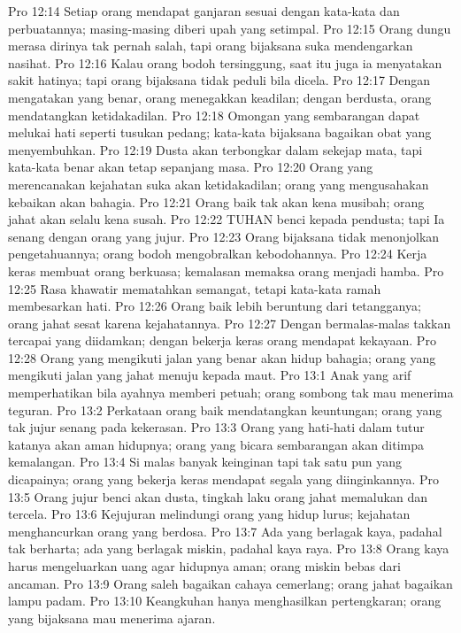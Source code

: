 Pro 12:14  Setiap orang mendapat ganjaran sesuai dengan kata-kata dan perbuatannya; masing-masing diberi upah yang setimpal.
Pro 12:15  Orang dungu merasa dirinya tak pernah salah, tapi orang bijaksana suka mendengarkan nasihat.
Pro 12:16  Kalau orang bodoh tersinggung, saat itu juga ia menyatakan sakit hatinya; tapi orang bijaksana tidak peduli bila dicela.
Pro 12:17  Dengan mengatakan yang benar, orang menegakkan keadilan; dengan berdusta, orang mendatangkan ketidakadilan.
Pro 12:18  Omongan yang sembarangan dapat melukai hati seperti tusukan pedang; kata-kata bijaksana bagaikan obat yang menyembuhkan.
Pro 12:19  Dusta akan terbongkar dalam sekejap mata, tapi kata-kata benar akan tetap sepanjang masa.
Pro 12:20  Orang yang merencanakan kejahatan suka akan ketidakadilan; orang yang mengusahakan kebaikan akan bahagia.
Pro 12:21  Orang baik tak akan kena musibah; orang jahat akan selalu kena susah.
Pro 12:22  TUHAN benci kepada pendusta; tapi Ia senang dengan orang yang jujur.
Pro 12:23  Orang bijaksana tidak menonjolkan pengetahuannya; orang bodoh mengobralkan kebodohannya.
Pro 12:24  Kerja keras membuat orang berkuasa; kemalasan memaksa orang menjadi hamba.
Pro 12:25  Rasa khawatir mematahkan semangat, tetapi kata-kata ramah membesarkan hati.
Pro 12:26  Orang baik lebih beruntung dari tetangganya; orang jahat sesat karena kejahatannya.
Pro 12:27  Dengan bermalas-malas takkan tercapai yang diidamkan; dengan bekerja keras orang mendapat kekayaan.
Pro 12:28  Orang yang mengikuti jalan yang benar akan hidup bahagia; orang yang mengikuti jalan yang jahat menuju kepada maut.
Pro 13:1  Anak yang arif memperhatikan bila ayahnya memberi petuah; orang sombong tak mau menerima teguran.
Pro 13:2  Perkataan orang baik mendatangkan keuntungan; orang yang tak jujur senang pada kekerasan.
Pro 13:3  Orang yang hati-hati dalam tutur katanya akan aman hidupnya; orang yang bicara sembarangan akan ditimpa kemalangan.
Pro 13:4  Si malas banyak keinginan tapi tak satu pun yang dicapainya; orang yang bekerja keras mendapat segala yang diinginkannya.
Pro 13:5  Orang jujur benci akan dusta, tingkah laku orang jahat memalukan dan tercela.
Pro 13:6  Kejujuran melindungi orang yang hidup lurus; kejahatan menghancurkan orang yang berdosa.
Pro 13:7  Ada yang berlagak kaya, padahal tak berharta; ada yang berlagak miskin, padahal kaya raya.
Pro 13:8  Orang kaya harus mengeluarkan uang agar hidupnya aman; orang miskin bebas dari ancaman.
Pro 13:9  Orang saleh bagaikan cahaya cemerlang; orang jahat bagaikan lampu padam.
Pro 13:10  Keangkuhan hanya menghasilkan pertengkaran; orang yang bijaksana mau menerima ajaran.
